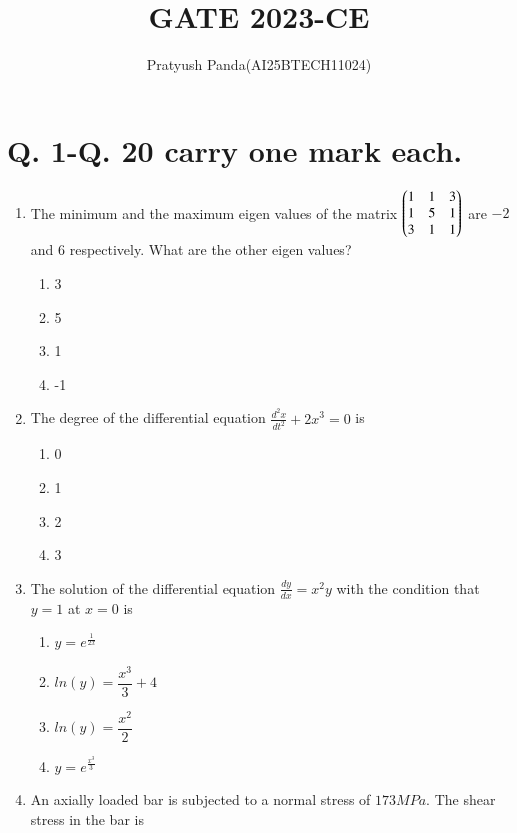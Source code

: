 \documentclass[journal,12pt,onecolumn]{IEEEtran}
\theoremstyle{remark}
\begin{document}
\title{GATE 2023-CE}
\author{Pratyush Panda(AI25BTECH11024)}
\maketitle

\renewcommand{\thefigure}{\theenumi}
\renewcommand{\thetable}{\theenumi}

\section*{Q. 1-Q. 20 carry one mark each.}

\begin{enumerate}
\item  The minimum and the maximum eigen values of the matrix $\begin{pmatrix}1 & 1 & 3\\1 & 5 & 1\\3 & 1 & 1\end{pmatrix}$ are $-2$ and $6$ respectively. What are the other eigen values?

\hfill{}
\begin{enumerate}
\item 3
\item 5
\item 1
\item -1
\end{enumerate}

\item The degree of the differential equation $\frac{d^2x}{dt^2}+2x^3=0$ is

\hfill{}
\begin{enumerate}
\item 0
\item 1
\item 2
\item 3
\end{enumerate}

\item The solution of the differential equation $\frac{dy}{dx}=x^2y$ with the condition that $y=1$ at $x=0$ is

\hfill{}
\begin{enumerate}
\item $y=e^{\frac{1}{2x}}$
\item $ln(y)=\dfrac{x^3}{3}+4$
\item $ln(y)=\dfrac{x^2}{2}$
\item $y=e^{\frac{x^3}{3}}$
\end{enumerate}

\item An axially loaded bar is subjected to a normal stress of $173MPa$. The shear stress in the bar is


\end{enumerate}
\end{document}
